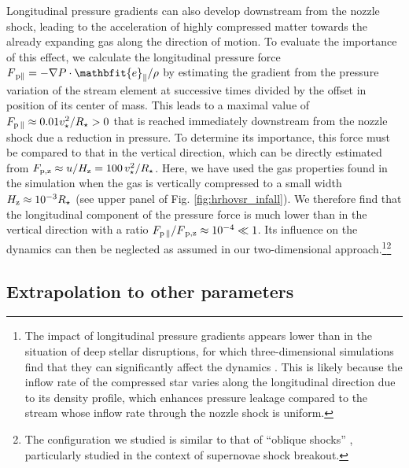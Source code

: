 \documentclass[a4paper,fleqn,usenatbib]{mnras}
\newcommand{\vect}[1]{\mathbfit{#1}}
\newcommand{\rstar}{R_{\star}}
\begin{document}
Longitudinal pressure gradients can also develop downstream from the nozzle shock, leading to the acceleration of highly compressed matter towards the already expanding gas along the direction of motion. To evaluate the importance of this effect, we calculate the longitudinal pressure force $F_{\rm \, p \parallel} = -\nabla P \cdot \vect{e}_{\parallel}/\rho$ by estimating the gradient from the pressure variation of the stream element at successive times divided by the offset in position of its center of mass. This leads to a maximal value of $F_{\rm  p \,\parallel} \approx  0.01 v^2_{\star}/R_{\star} >0$ that is reached immediately downstream from the nozzle shock due a reduction in pressure. To determine its importance, this force must be compared to that in the vertical direction, which can be directly estimated from $F_{\rm p ,z} \approx u/H_{\rm z} = 100 \, v^2_{\star}/R_{\star}$. Here, we have used the gas properties found in the simulation when the gas is vertically compressed to a small width $H_{\rm z} \approx 10^{-3} \rstar$ (see upper panel of Fig. \ref{fig:hrhovsr_infall}). We therefore find that the longitudinal component of the pressure force is much lower than in the vertical direction with a ratio $F_{\rm p  \, \parallel} / F_{\rm \, p ,z} \approx 10^{-4} \ll 1$. Its influence on the dynamics can then be neglected as assumed in our two-dimensional approach.\footnote{The impact of longitudinal pressure gradients appears lower than in the situation of deep stellar disruptions, for which three-dimensional simulations find that they can significantly affect the dynamics \citep{guillochon2009}. This is likely because the inflow rate of the compressed star varies along the longitudinal direction due to its density profile, which enhances pressure leakage compared to the stream whose inflow rate through the nozzle shock is uniform.}\footnote{The configuration we studied is similar to that of ``oblique shocks'' \citep[e.g.][]{matzner2013}, particularly studied in the context of supernovae shock breakout.}







\subsection{Extrapolation to other parameters}
\label{sec:extrapolation}
\end{document}

